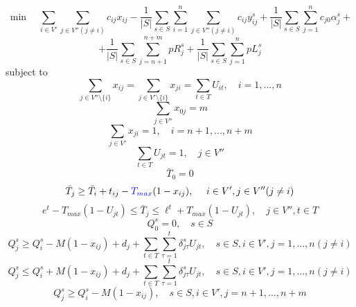 \documentclass[authoryear,preprint,12pt]{elsarticle}
\newcommand{\rev}[1]{\textcolor{blue}{{#1}}}
\begin{document}
$$
 \min \quad  \sum_{i \in V'} \sum_{j \in V'' (j\neq i)} c_{ij} {x}_{ij} - \frac{1}{|S|} \sum_{s \in S} \sum_{i=1}^n \sum_{j \in V''(j\neq i)} c_{ij} {y}_{ij}^s + \frac{1}{|S|} \sum_{s \in S} \sum_{j=1}^n  c_{j0} \alpha_j^s + 
$$
\begin{equation}\label{of}
+ \frac{1}{|S|} \sum_{s \in S} \sum_{j=n+1}^{n+m}  p R_j^s + \frac{1}{|S|} \sum_{s \in S} \sum_{j=1}^n p L_j^s
\end{equation}
subject to
%
\begin{equation}\label{c1}
    \sum_{j \in V''\setminus\{i\}} x_{ij} = \sum_{j \in V'\setminus\{i\}}x_{ji} = \sum_{t\in T}U_{it}, \quad i=1,...,n 
\end{equation}
%
\begin{equation}\label{c2}
    \sum_{j \in V''}x_{0j} = m 
\end{equation}
%
\begin{equation}\label{c3}
    \sum_{j \in V'} x_{ji} = 1, \quad i=n+1,...,n+m 
\end{equation}
%
\begin{equation}\label{c4}
  \sum_{t\in T}U_{jt}=1, \quad j\in V''
\end{equation}
%
\begin{equation}\label{c5}
    \bar{T}_0=0 
\end{equation}
%
\begin{equation}\label{c5'}
    \bar{T}_j \geq \bar{T}_i + t_{ij}-\rev{T_{max}}(1-x_{ij}), \quad \ i \in V', j \in V''(j \neq i)
\end{equation}
%
\begin{equation}\label{c6}
  e^t - T_{max} (1-U_{jt}) \leq \bar{T}_j \leq \ell^t + T_{max} (1-U_{jt}), \quad j \in V'', t \in T
\end{equation}
%
\begin{equation}\label{c7}
    Q_0^s =0, \quad  s \in S
\end{equation}
%
\begin{equation}\label{c8}
    Q_j^s \geq Q_i^s -M(1-x_{ij})+ d_j +\sum_{t\in T}\sum_{\tau=1}^t\delta_{j\tau}^sU_{jt}, \quad s \in S, i\in V', j=1,...,n  (j\neq i) 
\end{equation}
%
\begin{equation}\label{c8.1}
    Q_j^s \leq Q_i^s + M(1-x_{ij})+ d_j +\sum_{t\in T}\sum_{\tau=1}^t\delta_{j\tau}^sU_{jt}, \quad s \in S, i\in V', j=1,...,n  (j\neq i) 
\end{equation}
%
\begin{equation}\label{c9}
    Q_j^s \geq Q_i^s -M(1-x_{ij}), \quad s \in S, i\in V', j=n+1,...,n+m 
\end{equation}
\end{document}
